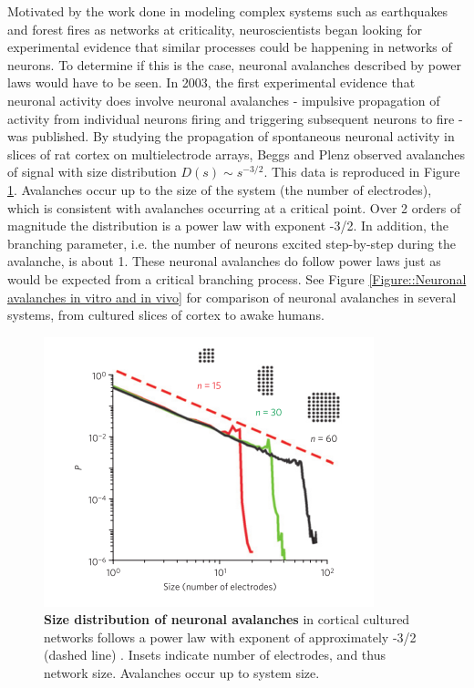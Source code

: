 \documentclass[12pt]{article}
\begin{document}
Motivated by the work done in modeling complex systems such as earthquakes and forest fires as networks at criticality, neuroscientists began looking for experimental evidence that similar processes could be happening in networks of neurons. To determine if this is the case, neuronal avalanches described by power laws would have to be seen. In 2003, the first experimental evidence that neuronal activity does involve neuronal avalanches - impulsive propagation of activity from individual neurons firing and triggering subsequent neurons to fire - was published\cite{Beggs2003b}. By studying the propagation of spontaneous neuronal activity in slices of rat cortex on multielectrode arrays, Beggs and Plenz observed avalanches of signal with size distribution $ D(s) \sim s^{-3/2} $.  This data is reproduced in Figure \ref{Figure::Neuronal Avalanches}. Avalanches occur up to the size of the system (the number of electrodes), which is consistent with avalanches occurring at a critical point. Over 2 orders of magnitude the distribution is a power law with exponent -3/2. In addition, the branching parameter, i.e. the number of neurons excited step-by-step during the avalanche, is about 1. These neuronal avalanches do follow power laws just as would be expected from a critical branching process. See Figure \ref{Figure::Neuronal avalanches in vitro and in vivo} for comparison of neuronal avalanches in several systems, from cultured slices of cortex to awake humans. 
 
\begin{figure}      
  \begin{center}    
 \includegraphics[width=.6\textwidth]{originalavalancheplenz}    
    \caption{\textbf{Size distribution of neuronal avalanches} in cortical cultured networks follows a power law with exponent of approximately -3/2 (dashed line) \cite{Beggs2003b}. Insets indicate number of electrodes, and thus network size. Avalanches occur up to system size.}
   \label{Figure::Neuronal Avalanches}   
  \end{center}     
   \end{figure}
   
\end{document}
